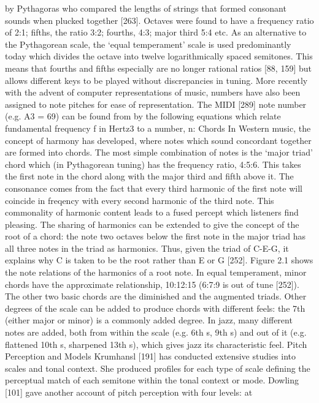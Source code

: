 by Pythagoras who compared the lengths of strings that formed consonant sounds when plucked
together [263]. Octaves were found to have a frequency ratio of 2:1; fifths, the ratio 3:2; fourths,
4:3; major third 5:4 etc. As an alternative to the Pythagorean scale, the ‘equal temperament’
scale is used predominantly today which divides the octave into twelve logarithmically spaced
semitones. This means that fourths and fifths especially are no longer rational ratios [88, 159]
but allows different keys to be played without discrepancies in tuning.
More recently with the advent of computer representations of music, numbers have also been
assigned to note pitches for ease of representation. The MIDI [289] note number (e.g. A3 = 69)
can be found from by the following equations which relate fundamental frequency f in Hertz3 to
a number, n:
Chords
In Western music, the concept of harmony has developed, where notes which sound concordant
together are formed into chords. The most simple combination of notes is the ‘major triad’ chord
which (in Pythagorean tuning) has the frequency ratio, 4:5:6. This takes the first note in the
chord along with the major third and fifth above it. The consonance comes from the fact that
every third harmonic of the first note will coincide in freqency with every second harmonic of
the third note. This commonality of harmonic content leads to a fused percept which listeners
find pleasing. The sharing of harmonics can be extended to give the concept of the root of a
chord: the note two octaves below the first note in the major triad has all three notes in the triad
as harmonics. Thus, given the triad of C-E-G, it explains why C is taken to be the root rather
than E or G [252]. Figure 2.1 shows the note relations of the harmonics of a root note. In equal
temperament, minor chords have the approximate relationship, 10:12:15 (6:7:9 is out of tune
[252]). The other two basic chords are the diminished and the augmented triads.
Other degrees of the scale can be added to produce chords with different feels: the 7th (either
major or minor) is a commonly added degree. In jazz, many different notes are added, both from
within the scale (e.g. 6th s, 9th s) and out of it (e.g. flattened 10th s, sharpened 13th s), which gives
jazz its characteristic feel.
Pitch Perception and Models
Krumhansl [191] has conducted extensive studies into scales and tonal context. She produced
profiles for each type of scale defining the perceptual match of each semitone within the tonal
context or mode. Dowling [101] gave another account of pitch perception with four levels: at
